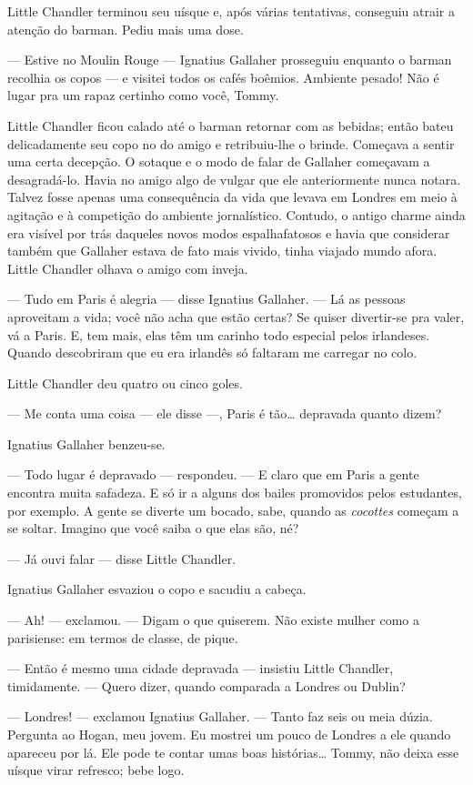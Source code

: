 Little Chandler terminou seu uísque e, após várias tentativas,
conseguiu atrair a atenção do barman. Pediu mais uma dose.

--- Estive no Moulin Rouge --- Ignatius Gallaher prosseguiu enquanto o
barman recolhia os copos --- e visitei todos os cafés boêmios.
Ambiente pesado! Não é lugar pra um rapaz certinho como você, Tommy.

Little Chandler ficou calado até o barman retornar com as bebidas;
então bateu delicadamente seu copo no do amigo e retribuiu-lhe o
brinde. Começava a sentir uma certa decepção. O sotaque e o modo de
falar de Gallaher começavam a desagradá-lo. Havia no amigo algo de
vulgar que ele anteriormente nunca notara. Talvez fosse apenas uma
consequência da vida que levava em Londres em meio à agitação e à
competição do ambiente jornalístico. Contudo, o antigo charme ainda
era visível por trás daqueles novos modos espalhafatosos e havia que
considerar também que Gallaher estava de fato mais vivido, tinha
viajado mundo afora. Little Chandler olhava o amigo com inveja.

--- Tudo em Paris é alegria --- disse Ignatius Gallaher. --- Lá as
pessoas aproveitam a vida; você não acha que estão certas? Se quiser
divertir-se pra valer, vá a Paris. E, tem mais, elas têm um carinho
todo especial pelos irlandeses. Quando descobriram que eu era irlandês
só faltaram me carregar no colo.

Little Chandler deu quatro ou cinco goles.

--- Me conta uma coisa --- ele disse ---, Paris é tão\ldots{} depravada
quanto dizem?

Ignatius Gallaher benzeu-se.

--- Todo lugar é depravado --- respondeu. --- E claro que em Paris a
gente encontra muita safadeza. E só ir a alguns dos bailes promovidos
pelos estudantes, por exemplo. A gente se diverte um bocado, sabe,
quando as \textit{cocottes} começam a se soltar. Imagino que você saiba o que
elas são, né?

--- Já ouvi falar --- disse Little Chandler.

Ignatius Gallaher esvaziou o copo e sacudiu a cabeça.

--- Ah! --- exclamou. --- Digam o que quiserem. Não existe mulher como
a parisiense: em termos de classe, de pique.

--- Então é mesmo uma cidade depravada --- insistiu Little Chandler,
timidamente. --- Quero dizer, quando comparada a Londres ou Dublin?

--- Londres! --- exclamou Ignatius Gallaher. --- Tanto faz seis ou
meia dúzia. Pergunta ao Hogan, meu jovem. Eu mostrei um pouco de
Londres a ele quando apareceu por lá. Ele pode te contar umas boas
histórias\ldots{} Tommy, não deixa esse uísque virar refresco; bebe logo.

